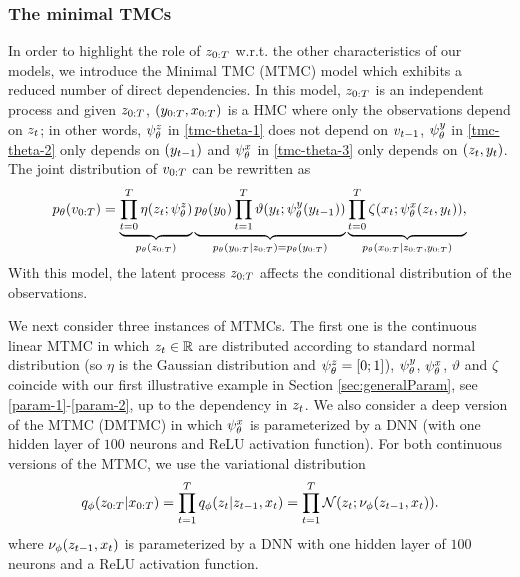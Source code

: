 \subsubsection{The minimal TMCs}
\label{sec:tmc_models}
In order to highlight the role of $z_{0:T}$ 
w.r.t. the other characteristics of our models,
we introduce the Minimal TMC (MTMC) model which exhibits a reduced number of direct dependencies.
In this model, $z_{0:T}$ is an independent process
and given $z_{0:T}$, $(y_{0:T},x_{0:T})$ is a HMC where only the observations depend on $z_t$; 
in other words, $\psi^{z}_{\theta}$ in \eqref{tmc-theta-1} does not
depend on ${v}_{t-1}$, $\psi^{y}_{\theta}$ in \eqref{tmc-theta-2} only depends
on $(y_{t-1})$ and  $\psi^{x}_{\theta}$ in \eqref{tmc-theta-3}
only depends on $(z_t,y_{t})$. 
The joint distribution of ${v}_{0:T}$ can be rewritten as 
\begin{equation}
\label{joint-tmmc}
p_{\theta}({v}_{0:T})=\underbrace{\prod_{t=0}^T 
\eta(z_t; \psi^{z}_{\theta})}_{p_{\theta}(z_{0:T})} \underbrace{p_{\theta}(y_0) \prod_{t=1}^T \vartheta(y_t;\psi^{y}_{\theta}(y_{t-1}))}_{p_{\theta}(y_{0:T}|z_{0:T})=p_{\theta}(y_{0:T})} 
\underbrace{\prod_{t=0}^T \zeta(x_t;\psi^{x}_{\theta}(z_t,y_{t}))\text{,}}_{p_{\theta}(x_{0:T}|z_{0:T},y_{0:T})}
\end{equation}
With this model, the latent process  $z_{0:T}$
affects the conditional distribution of the observations.

We next consider three instances of MTMCs. The first one is the continuous linear MTMC in which $z_t \in \mathbb{R}$ are distributed according to standard normal distribution (so $\eta$ is the Gaussian distribution and $\psi^{z}_{\theta}=[0;1]$), $\psi^{y}_{\theta}$, $\psi^{x}_{\theta}$, $\vartheta$ and $\zeta$ coincide with our first illustrative example in Section \ref{sec:generalParam}, see \eqref{param-1}-\eqref{param-2}, up to the dependency in $z_t$. We also consider a deep version of the MTMC (DMTMC) in which  $\psi^{x}_{\theta}$ is
parameterized by a DNN (with one hidden layer of $100$ neurons and ReLU activation function). For both continuous versions of the MTMC, we use the variational distribution 
\begin{equation}
    q_{\phi}(z_{0:T}|x_{0:T})=\prod_{t=1}^Tq_{\phi}(z_t|z_{t-1},x_t)=\prod_{t=1}^T
    \mathcal{N}(z_t;\nu_{\phi}(z_{t-1},x_t)).
    \label{eq:tmc_simple_q}
\end{equation}
where $\nu_{\phi}(z_{t-1},x_t)$ is parameterized by a DNN with one hidden layer of $100$ neurons and a ReLU activation function.

